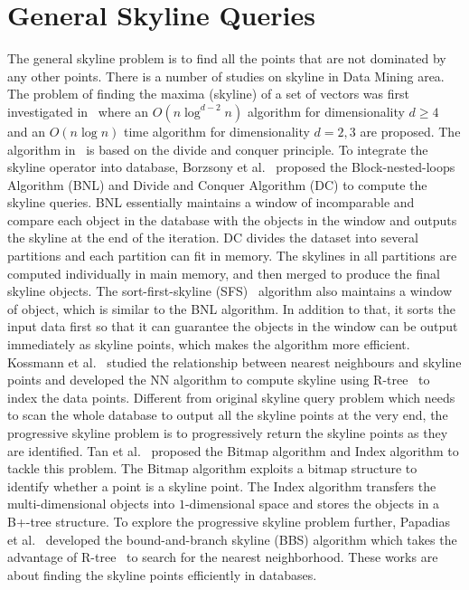 \section{General Skyline Queries}
\label{sec:rel:general}
The general skyline problem is to find all the points that are not dominated by any other points.
There is a number of studies on skyline in Data Mining area. The problem of finding the maxima (skyline) of a set of vectors was first investigated in~\cite{kung1975finding} where an $O(n\log ^{d-2}n)$ algorithm for dimensionality $d\geq 4$ and an $O(n\log n)$ time algorithm for dimensionality $d = 2, 3$ are proposed. The algorithm in~\cite{kung1975finding} is based on the divide and conquer principle. To integrate the skyline operator into database, Borzsony et al.~\cite{borzsony2001skyline} proposed the Block-nested-loops Algorithm (BNL) and Divide and Conquer Algorithm (DC) to compute the skyline queries.
BNL essentially maintains a window of incomparable and compare each object in the database with the objects in the window and outputs the skyline at the end of the iteration. DC divides the dataset into several partitions and each partition can fit in memory. The skylines in all partitions are computed individually in main memory, and then merged to produce the final skyline objects. 
The sort-first-skyline (SFS)~\cite{chomicki2003skyline} algorithm also maintains a window of object, which is similar to the BNL algorithm. In addition to that, it sorts the input data first so that it can guarantee the objects in the window can be output immediately as skyline points, which makes the algorithm more efficient.
Kossmann et al.~\cite{kossmann2002shooting} studied the relationship between nearest neighbours and skyline points and developed the NN algorithm to compute skyline using R-tree~\cite{beckmann1990r} to index the data points.
Different from original skyline query problem which needs to scan the whole database to output all the skyline points at the very end, the progressive skyline problem is to progressively return the skyline points as they are identified. Tan et al.~\cite{tan2001efficient} proposed the Bitmap algorithm and Index algorithm to tackle this problem. The Bitmap algorithm exploits a bitmap structure to identify whether a point is a skyline point. The Index algorithm transfers the multi-dimensional objects into $1$-dimensional space and stores the objects in a B+-tree structure. To explore the progressive skyline problem further, Papadias et al.~\cite{papadias2003optimal, papadias2005progressive} developed the bound-and-branch skyline (BBS) algorithm which takes the advantage of R-tree~\cite{beckmann1990r} to search for the nearest neighborhood. These works are about finding the skyline points efficiently in databases.

